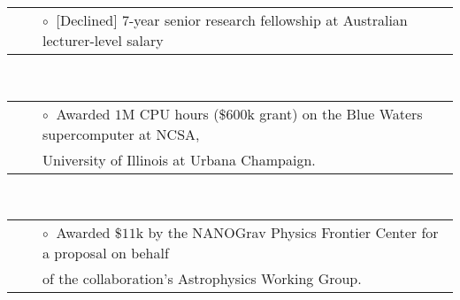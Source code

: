 \documentclass[11pt,letterpaper,sans]{moderncv}
\begin{document}
\begin{tabular}{rcl}
&\hspace{0.4cm} &{\color{color1} $\circ\;\;$}[Declined] $7$-year senior research fellowship at Australian lecturer-level salary 
\end{tabular} \\
\begin{tabular}{rcl}
&\hspace{0.4cm} &{\color{color1} $\circ\;\;$}Awarded $1$M CPU hours ($\$600$k grant) on the Blue Waters supercomputer at NCSA, \\
&\hspace{0.4cm} &  \hspace{0.4cm}University of Illinois at Urbana Champaign. \\
\end{tabular} \\
\begin{tabular}{rcl}
&\hspace{0.4cm} &{\color{color1} $\circ\;\;$}Awarded $\$11$k by the NANOGrav Physics Frontier Center for a proposal on behalf \\
&\hspace{0.4cm} &  \hspace{0.4cm}of the collaboration's Astrophysics Working Group. \\
\end{tabular} \\
\end{document}
